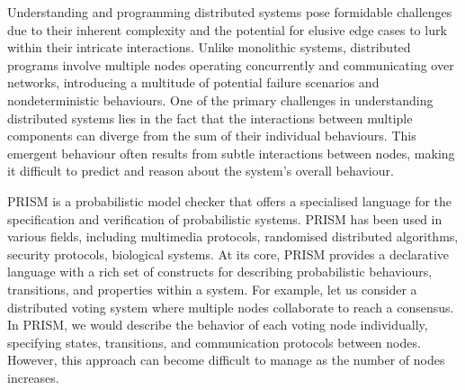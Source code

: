 Understanding and programming distributed systems pose formidable
challenges due to their inherent complexity and the potential for
elusive edge cases to lurk within their intricate interactions. Unlike
monolithic systems, distributed programs involve multiple nodes
operating concurrently and communicating over networks, introducing a
multitude of potential failure scenarios and nondeterministic
behaviours.
%
One of the primary challenges in understanding distributed systems
lies in the fact that the interactions between multiple components can
diverge from the sum of their individual behaviours. This emergent
behaviour often results from subtle interactions between nodes, making
it difficult to predict and reason about the system's overall
behaviour.

PRISM \cite{PRISMdoc} is a probabilistic model checker that offers a
specialised language for the specification and verification of
probabilistic systems. PRISM has been used in various fields,
including multimedia protocols, randomised distributed algorithms,
security protocols, biological systems.  At its core, PRISM provides a
declarative language with a rich set of constructs for describing
probabilistic behaviours, transitions, and properties within a system.
For example, let us consider a distributed voting system where
multiple nodes collaborate to reach a consensus. In PRISM, we would
describe the behavior of each voting node individually, specifying
states, transitions, and communication protocols between
nodes. However, this approach can become difficult to manage as the
number of nodes increases.

%

